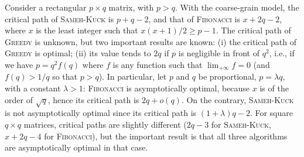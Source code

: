 \documentclass[a4paper,twopages]{article}
\newcommand{\SK}{\textsc{Sameh-Kuck}\xspace}
\newcommand{\MC}{\textsc{Fibonacci}\xspace}
\newcommand{\Greedy}{\textsc{Greedy}\xspace}
\begin{document}
Consider a rectangular $p \times q$ matrix, with $p>q$.  With the coarse-grain
model, the critical path of \SK is $p+q-2$, and that of \MC is $x + 2q - 2$,
where $x$ is the least integer such that $x(x+1)/2 \geq p-1$.  The critical
path of \Greedy is unknown, but two important results are known: (i) the
critical path of \Greedy is optimal; (ii) its value tends to $2q$ if $p$ is
negligible in front of $q^2$, i.e., if we have $p = q^2 f(q)$ where $f$ is any
function such that $\lim_{+\infty} f= 0$ (and $f(q) > 1/q$ so that $p > q$).
In particular, let $p$ and $q$ be proportional, $p = \lambda q$, with a
constant $\lambda > 1$: \MC is asymptotically optimal, because $x$ is of the
order of $\sqrt{q}$, hence its critical path is $2q + o(q)$. On the contrary,
\SK is not asymptotically optimal since its critical path is $(1+\lambda)q -
2$.  For square $q \times q$ matrices, critical paths are slightly different
($2q-3$ for \SK, $x+2q-4$ for \MC), but the important result is that all three
algorithms are asymptotically optimal in that case.
\end{document}
